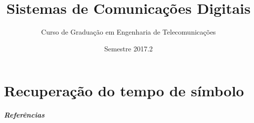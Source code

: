 \documentclass{beamer}
\title[Sist. de Com. Digital]{Sistemas de Comunicações Digitais}
\author[DETI]{Curso de Graduação em Engenharia de Telecomunicações}
\institute[UFC]{\normalsize Universidade Federal do Ceará}
\date{Semestre 2017.2}
\begin{document}
\begin{frame}
	\titlepage
\end{frame}


% 

% 

% 

% 

% 

% 

% 

\part{Recuperação do tempo de símbolo}


\begin{frame}
    \frametitle{Referências}
    
    
\end{frame}
\end{document}
